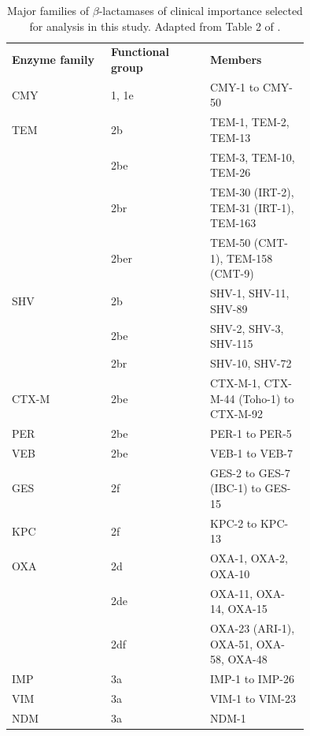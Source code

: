 \documentclass[aps,rmp,preprint,superscriptaddress,10pt,twocolumn]{revtex4-1}
\begin{document}
\begin{table}[ht]
\begin{small}
\begin{tabular}{p{0.25\linewidth}p{0.25\linewidth}p{0.25\linewidth}}
\textbf{Enzyme family} & \textbf{Functional group} & \textbf{Members}                  \\
CMY            & 1, 1e                        & CMY-1 to CMY-50                         \\
TEM         & 2b                           & TEM-1, TEM-2, TEM-13                 \\
               & 2be                          & TEM-3, TEM-10, TEM-26                    \\
               & 2br                          & TEM-30 (IRT-2), TEM-31 (IRT-1), TEM-163 \\
               & 2ber                         & TEM-50 (CMT-1), TEM-158 (CMT-9)         \\
SHV            & 2b                           & SHV-1, SHV-11, SHV-89                   \\
               & 2be                          & SHV-2, SHV-3, SHV-115                   \\
               & 2br                          & SHV-10, SHV-72                          \\
CTX-M          & 2be                          & CTX-M-1, CTX-M-44 (Toho-1) to CTX-M-92  \\
PER            & 2be                          & PER-1 to PER-5                          \\
VEB            & 2be                          & VEB-1 to VEB-7                          \\
GES            & 2f                           & GES-2 to GES-7 (IBC-1) to GES-15        \\
KPC            & 2f                           & KPC-2 to KPC-13                         \\
OXA            & 2d                           & OXA-1, OXA-2, OXA-10                    \\
               & 2de                          & OXA-11, OXA-14, OXA-15                  \\
               & 2df                          & OXA-23 (ARI-1), OXA-51, OXA-58, OXA-48         \\
IMP            & 3a                           & IMP-1 to IMP-26                         \\
VIM            & 3a                           & VIM-1 to VIM-23                         \\
NDM             & 3a                            & NDM-1
\end{tabular}
\end{small}
\caption{Major families of $\beta$-lactamases of clinical importance selected for analysis in this study. Adapted from Table 2 of \textcite{Bush2010}.}
\label{table:families}
\end{table}
\end{document}
